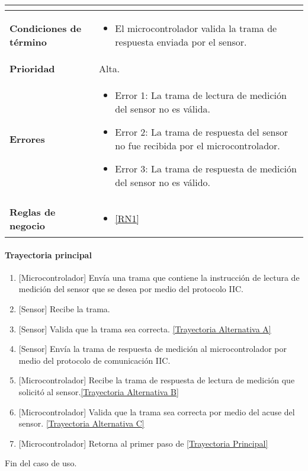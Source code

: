\begin{longtable}{|J{5cm}|J{10.3cm}|}
\begin{itemize}
		\end{itemize} \\ \hline
	\textbf{Condiciones de término} & 
		\begin{itemize}
		    \item El microcontrolador valida la trama de respuesta enviada por el sensor.
		\end{itemize} 
		\\ \hline 
	\textbf{Prioridad} & 
		Alta. \\ \hline
	\textbf{Errores} &
		 \begin{itemize}
		 	\item \label{SUB-M-CU1.1:Error1} Error 1: La trama de lectura de medición del sensor no es válida.
		 	\item \label{SUB-M-CU1.1:Error2} Error 2: La trama de respuesta del sensor no fue recibida por el microcontrolador.
		 	\item \label{SUB-M-CU1.1:Error3} Error 3: La trama de respuesta de medición del sensor no es válido.
		 \end{itemize} \\ \hline
	\textbf{Reglas de negocio} & 
	    \begin{itemize}
	      \item  \ref{RN1}
		 \end{itemize}\\ \hline
\end{longtable}

\paragraph{Trayectoria principal}
\label{SUB-M-CU1.1:TP}
	\begin{enumerate}
	    \item {[Microcontrolador]} Envía una trama que contiene la instrucción de lectura de medición del sensor que se desea por medio del protocolo IIC.
	    \item {[Sensor]} Recibe la trama.
	    \item {[Sensor]} Valida que la trama sea correcta. \hyperref[SUB-M-CU1.1:TA]{[Trayectoria Alternativa A]} %
		\item {[Sensor]} Envía la trama de respuesta de medición al microcontrolador por medio del protocolo de comunicación IIC.
		\item {[Microcontrolador]} Recibe la trama de respuesta de lectura de medición que solicitó al sensor.\hyperref[SUB-M-CU1.1:TB]{[Trayectoria Alternativa B]} %
		\item {[Microcontrolador]} Valida que la trama sea correcta por medio del acuse del sensor. \hyperref[SUB-M-CU1.1:TC]{[Trayectoria Alternativa C]}%
		\item {[Microcontrolador]} Retorna al primer paso de \hyperref[SUB-M-CU1.1:TP]{[Trayectoria Principal]}
	\end{enumerate}
	Fin del caso de uso.

